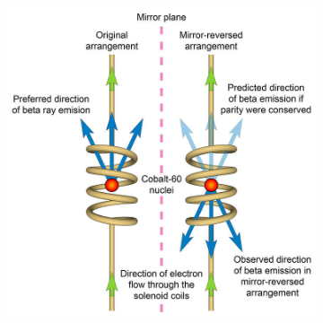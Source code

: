 	\begin{figure}[H]
		\begin{subfigure}{0.5\linewidth}
			\centering
			\includegraphics[width=0.6\plotwidth]{fig/chapt2/Wu_experiment.jpg}
			\caption{\label{fig:parity-violation:A}}
		\end{subfigure}
		\begin{subfigure}{0.5\linewidth}
			\centering

\end{subfigure}
\end{figure}
